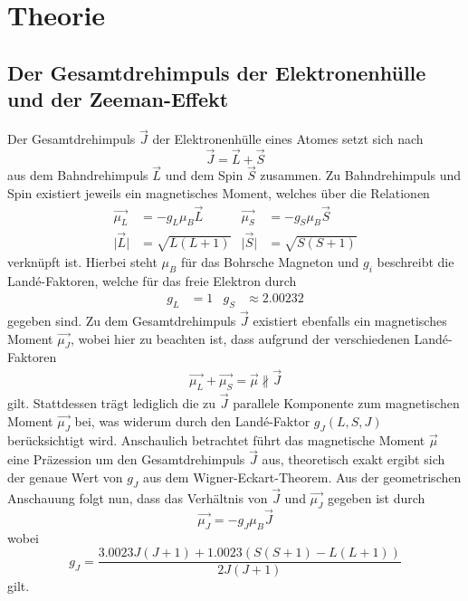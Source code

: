 \section{Theorie}
\label{sec:Theorie}

\subsection{Der Gesamtdrehimpuls der Elektronenhülle und der Zeeman-Effekt}
Der Gesamtdrehimpuls $\vec{J}$ der Elektronenhülle eines Atomes setzt sich nach
\begin{equation}
  \vec{J} = \vec{L} + \vec{S}
\end{equation}
aus dem Bahndrehimpuls $\vec{L}$ und dem Spin $\vec{S}$ zusammen.
Zu Bahndrehimpuls und Spin existiert jeweils ein magnetisches Moment, welches über die Relationen
\begin{align}
  \vec{\mu_L} &= - g_L \mu_B \vec{L} & \vec{\mu_S} &= - g_S \mu_B \vec{S} \\
  \lvert \vec{L} \rvert &= \sqrt{L(L+1)} & \lvert \vec{S} \rvert &= \sqrt{S(S+1)}
\end{align}
verknüpft ist.
Hierbei steht $\mu_B$ für das Bohrsche Magneton und $g_i$ beschreibt die Land\'{e}-Faktoren, welche für das freie Elektron durch
\begin{align}
  \label{eqn:5}
  g_L &= 1 & g_S &\approx \num{2.00232}
\end{align}
gegeben sind.
Zu dem Gesamtdrehimpuls $\vec{J}$ existiert ebenfalls ein magnetisches Moment $\vec{\mu_J}$, wobei hier zu beachten ist, dass aufgrund der verschiedenen Land\'{e}-Faktoren
\begin{align*}
  \vec{\mu_L} + \vec{\mu_S} = \vec{\mu} \nparallel \vec{J}
\end{align*}
gilt.
Stattdessen trägt lediglich die zu $\vec{J}$ parallele Komponente zum magnetischen Moment $\vec{\mu_J}$ bei, was widerum durch den Land\'{e}-Faktor $g_J(L, S, J)$ berücksichtigt wird.
Anschaulich betrachtet führt das magnetische Moment $\vec{\mu}$ eine Präzession um den Gesamtdrehimpuls $\vec{J}$ aus, theoretisch exakt ergibt sich der genaue Wert von $g_J$ aus dem Wigner-Eckart-Theorem.
Aus der geometrischen Anschauung folgt nun, dass das Verhältnis von $\vec{J}$ und $\vec{\mu_J}$ gegeben ist durch
\begin{equation}
  \vec{\mu_J} = - g_J \mu_B \vec{J}
\end{equation}
wobei
\begin{equation}
  g_J = \frac{ \num{3.0023} J \left(J+1\right) + \num{1.0023} \left( S \left( S+1 \right) - L \left(L+1\right) \right) }{ 2 J \left(J+1\right) }
\end{equation}
gilt. \\

